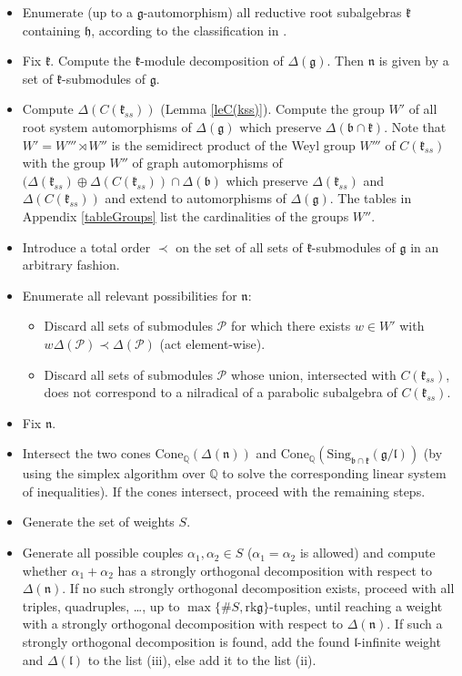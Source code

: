 \documentclass[12pt]{report}
\newcommand {\QQ} {\mathbb {Q}}
\newcommand{\kk}{\mathfrak{k}}
\newcommand{\nn}{\mathfrak{n}}
\newcommand{\hh}{\mathfrak{h}}
\newcommand{\gG}{\mathfrak{g}}
\newcommand{\bb}{\mathfrak{b}}
\newcommand{\lL}{\mathfrak{l}}
\newcommand{\Cone}{\mathrm{Cone}}
\newcommand{\hw}{\mathrm{Sing}}
\newcommand{\rk}{\mathrm{rk}}
\newcommand{\arxivVersion}[1]{#1}
\begin{document}
\begin{itemize}
\item Enumerate (up to a $\gG$-automorphism) all reductive root subalgebras $\kk$ containing $\hh$, according to the classification in \cite{Dynkin:Semisimple}.
\item Fix $\kk$. Compute the $\kk$-module decomposition of $\Delta(\gG)$. Then $\nn$ is given by a set of $\kk$-submodules of $\gG$. %
\item Compute $\Delta(C(\kk_{ss}))$ (Lemma \ref{leC(kss)}). Compute the group $W'$ of all root system automorphisms of $\Delta(\gG)$ which preserve $\Delta(\bb\cap\kk)$. Note that $W'=W'''\rtimes W''$ is the semidirect product of the Weyl group $W'''$ of $C(\kk_{ss})$ with the group $W''$ of graph automorphisms of $(\Delta(\kk_{ss})\oplus \Delta(C(\kk_{ss}))\cap\Delta(\bb)$ which preserve $\Delta(\kk_{ss})$ and $\Delta(C(\kk_{ss}))$ and extend to automorphisms of $\Delta(\gG)$. \arxivVersion{The tables in Appendix \ref{tableGroups} list the cardinalities of the groups $W''$.}
\item Introduce a total order $\prec$ on the set of all sets of $\kk$-submodules of $\gG$ in an arbitrary fashion.
\item Enumerate all relevant possibilities for $\nn$:
\begin{itemize} 
\item Discard all sets of submodules $\mathcal P$ for which there exists $w\in W'$ with $w\Delta(\mathcal P)\prec \Delta(\mathcal P)$ (act element-wise). 
\item Discard all sets of submodules $\mathcal P$ whose union, intersected with $C(\kk_{ss})$, does not correspond to a nilradical of a parabolic subalgebra of $C(\kk_{ss})$.
\end{itemize}
\item Fix $\nn$.
\item Intersect the two cones $\Cone_\QQ(\Delta(\nn))$ and $\Cone_\QQ(\hw_{\bb\cap\kk}(\gG/\lL))$ (by using the simplex algorithm over $\QQ$ to solve the corresponding linear system of inequalities). If the cones intersect, proceed with the remaining steps.
\item Generate the set of weights $S$.
\item Generate all possible couples $\alpha_1,\alpha_2\in S$ ($\alpha_1=\alpha_2$ is allowed) and compute whether $\alpha_1+\alpha_2$ has a strongly orthogonal decomposition with respect to $\Delta(\nn)$. If no such strongly orthogonal decomposition exists, proceed with all triples, quadruples, \dots, up to  $\max\{\# S, \rk\gG\}$-tuples, until reaching a weight with a strongly orthogonal decomposition with respect to $\Delta(\nn)$. If such a strongly orthogonal decomposition is found, add the found $\lL$-infinite weight and $\Delta(\lL)$ to the list (iii), else add it to the list (ii).

\end{itemize}
\end{document}
